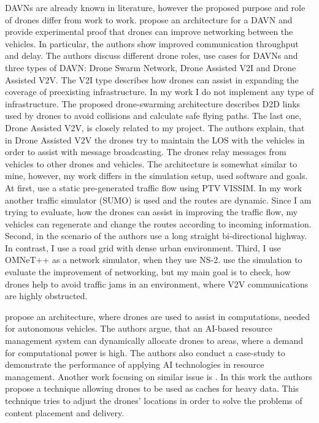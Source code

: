 \documentclass[]{nsm-thesis}
\begin{document}
\acp{DAVN} are already known in literature, however the proposed purpose and role of drones differ from work to work. \textcite{shi2018drone} propose an architecture for a \ac{DAVN} and provide experimental proof that drones can improve networking between the vehicles. In particular, the authors show improved communication throughput and delay. The authors discuss different drone roles, use cases for \acp{DAVN} and three types of \ac{DAVN}: Drone Swarm Network, Drone Assisted \ac{V2I} and Drone Assisted \ac{V2V}. The \ac{V2I} type describes how drones can assist in expanding the coverage of preexisting infrastructure. In my work I do not implement any type of infrastructure. The proposed drone-swarming architecture describes \ac{D2D} links used by drones to avoid collisions and calculate safe flying paths. The last one, Drone Assisted \ac{V2V}, is closely related to my project. The authors explain, that in Drone Assisted \ac{V2V} the drones try to maintain the \ac{LOS} with the vehicles in order to assist with message broadcasting. The drones relay messages from vehicles to other drones and vehicles. The architecture is somewhat similar to mine, however, my work differs in the simulation setup, used software and goals. At first, \textcite{shi2018drone} use a static pre-generated traffic flow using PTV VISSIM. In my work another traffic simulator (SUMO) is used and the routes are dynamic. Since I am trying to evaluate, how the drones can assist in improving the traffic flow, my vehicles can regenerate and change the routes according to incoming information. Second, in the scenario of \textcite{shi2018drone} the authors use a long straight bi-directional highway. In contrast, I use a road grid with dense urban environment. Third, I use OMNeT++ as a network simulator, when they use \ac{NS-2}. \textcite{shi2018drone} use the simulation to evaluate the improvement of networking, but my main goal is to check, how drones help to avoid traffic jams in an environment, where \ac{V2V} communications are highly obstructed.

\textcite{peng2021edge} propose an architecture, where drones are used to assist in computations, needed for autonomous vehicles. The authors argue, that an AI-based resource management system can dynamically allocate drones to areas, where a demand for computational power is high. The authors also conduct a case-study to demonstrate the performance of applying AI technologies in resource management. Another work focusing on similar issue is \textcite{Wu2020Caching}. In this work the authors propose a technique allowing drones to be used as caches for heavy data. This technique tries to adjust the drones' locations in order to solve the problems of content placement and delivery.
\end{document}
